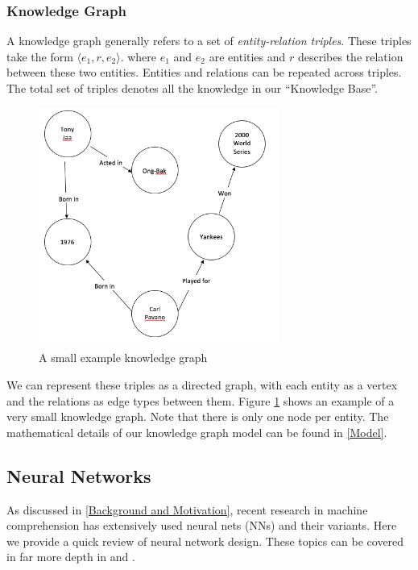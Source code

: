 \documentclass[pageno]{jpaper}
\begin{document}
\subsubsection{Knowledge Graph}
\label{Knowledge Graph}

A knowledge graph generally refers to a set of \textit{entity-relation triples}.
These triples take the form $\langle e_1, r, e_2 \rangle$. where $e_1$ and $e_2$
are entities and $r$ describes the relation between these two entities. Entities
and relations can be repeated across triples. The total set of triples denotes
all the knowledge in our ``Knowledge Base''.

\begin{figure}
    \centering
    \includegraphics[width=0.7\textwidth,keepaspectratio]{figures/Example_KG.png}
    \caption{A small example knowledge graph}
    \label{Figure: KG}
\end{figure}

We can represent these triples as a directed graph, with each entity as a vertex
and the relations as edge types between them. Figure \ref{Figure: KG} shows an
example of a very small knowledge graph. Note that there is only one node per
entity. The mathematical details of our knowledge graph model can be found in
\ref{Model}.

\subsection{Neural Networks}
\label{Neural Networks}

As discussed in \ref{Background and Motivation}, recent research in machine
comprehension has extensively used neural nets (NNs) and their variants. Here we
provide a quick review of neural network design. These topics can be covered in
far more depth in \cite{Bishop1995} and \cite{Nielsen2015}.
\end{document}
